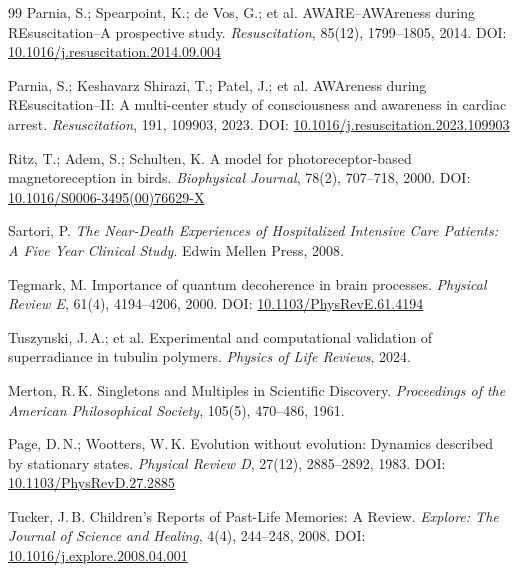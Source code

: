 \documentclass[11pt,a4paper]{article}
\begin{document}
\begin{thebibliography}{99}
Parnia, S.; Spearpoint, K.; de Vos, G.; et al.
\newblock AWARE--AWAreness during REsuscitation--A prospective study.
\newblock \emph{Resuscitation}, 85(12), 1799--1805, 2014.
\newblock DOI: \href{https://doi.org/10.1016/j.resuscitation.2014.09.004}{10.1016/j.resuscitation.2014.09.004}

Parnia, S.; Keshavarz Shirazi, T.; Patel, J.; et al.
\newblock AWAreness during REsuscitation--II: A multi-center study of
  consciousness and awareness in cardiac arrest.
\newblock \emph{Resuscitation}, 191, 109903, 2023.
\newblock DOI: \href{https://doi.org/10.1016/j.resuscitation.2023.109903}{10.1016/j.resuscitation.2023.109903}

Ritz, T.; Adem, S.; Schulten, K.
\newblock A model for photoreceptor-based magnetoreception in birds.
\newblock \emph{Biophysical Journal}, 78(2), 707--718, 2000.
\newblock DOI: \href{https://doi.org/10.1016/S0006-3495(00)76629-X}{10.1016/S0006-3495(00)76629-X}

Sartori, P.
\newblock \emph{The Near-Death Experiences of Hospitalized Intensive Care
  Patients: A Five Year Clinical Study}.
\newblock Edwin Mellen Press, 2008.

Tegmark, M.
\newblock Importance of quantum decoherence in brain processes.
\newblock \emph{Physical Review E}, 61(4), 4194--4206, 2000.
\newblock DOI: \href{https://doi.org/10.1103/PhysRevE.61.4194}{10.1103/PhysRevE.61.4194}

Tuszynski, J.\,A.; et al.
\newblock Experimental and computational validation of superradiance in tubulin
  polymers.
\newblock \emph{Physics of Life Reviews}, 2024.

Merton, R.\,K.
\newblock Singletons and Multiples in Scientific Discovery.
\newblock \emph{Proceedings of the American Philosophical Society},
  105(5), 470--486, 1961.

Page, D.\,N.; Wootters, W.\,K.
\newblock Evolution without evolution: Dynamics described by stationary states.
\newblock \emph{Physical Review D}, 27(12), 2885--2892, 1983.
\newblock DOI: \href{https://doi.org/10.1103/PhysRevD.27.2885}{10.1103/PhysRevD.27.2885}

Tucker, J.\,B.
\newblock Children's Reports of Past-Life Memories: A Review.
\newblock \emph{Explore: The Journal of Science and Healing}, 4(4), 244--248,
  2008.
\newblock DOI: \href{https://doi.org/10.1016/j.explore.2008.04.001}{10.1016/j.explore.2008.04.001}


\end{thebibliography}
\end{document}
